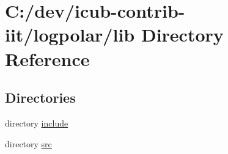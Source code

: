 \section{C\+:/dev/icub-\/contrib-\/iit/logpolar/lib Directory Reference}
\label{dir_97aefd0d527b934f1d99a682da8fe6a9}
\subsection*{Directories}
\begin{DoxyCompactItemize}
\item 
directory \hyperlink{dir_5a30104352ef4255dc24354b02eb2d20}{include}
\item 
directory \hyperlink{dir_a065c5f60305fee3569f887679366939}{src}
\end{DoxyCompactItemize}
